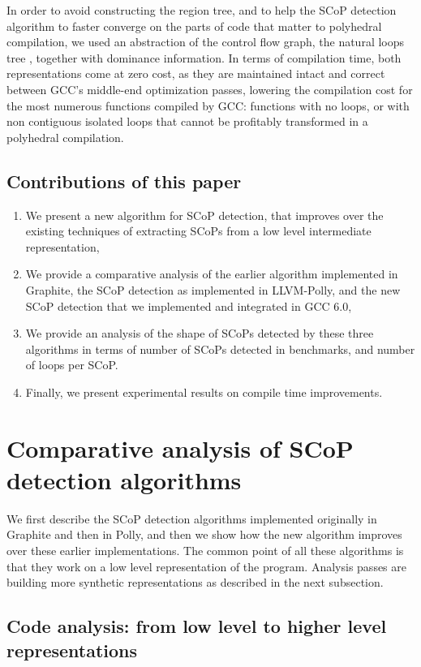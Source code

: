 \documentclass{sigplanconf}
\begin{document}
In order to avoid constructing the region tree, and to help the SCoP detection
algorithm to faster converge on the parts of code that matter to polyhedral
compilation, we used an abstraction of the control flow graph, the natural loops
tree \cite{dragonbook}, together with dominance information.  In terms of
compilation time, both representations come at zero cost, as they are maintained
intact and correct between GCC's middle-end optimization passes, lowering the
compilation cost for the most numerous functions compiled by GCC: functions with
no loops, or with non contiguous isolated loops that cannot be profitably
transformed in a polyhedral compilation.

\subsection{Contributions of this paper}
\begin{enumerate}
  \item We present a new algorithm for SCoP detection, that improves over the
    existing techniques of extracting SCoPs from a low level intermediate
    representation,
  \item We provide a comparative analysis of the earlier algorithm implemented
    in Graphite, the SCoP detection as implemented in LLVM-Polly, and the new
    SCoP detection that we implemented and integrated in GCC 6.0,
  \item We provide an analysis of the shape of SCoPs detected by these three
    algorithms in terms of number of SCoPs detected in benchmarks, and number of
    loops per SCoP.
  \item Finally, we present experimental results on compile time improvements.
\end{enumerate}

\newpage
\section{Comparative analysis of SCoP detection algorithms}

We first describe the SCoP detection algorithms implemented originally in
Graphite and then in Polly, and then we show how the new algorithm improves over
these earlier implementations.  The common point of all these algorithms is that
they work on a low level representation of the program.  Analysis passes are
building more synthetic representations as described in the next subsection.

\subsection{Code analysis: from low level to higher level representations}
\end{document}
